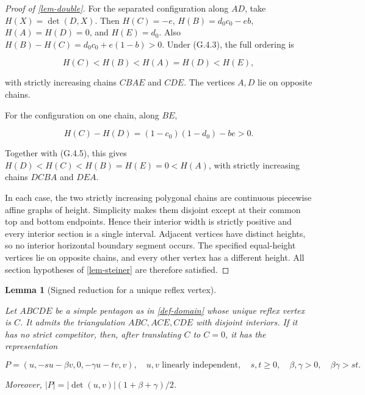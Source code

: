 \documentclass[11pt,a4paper]{article}
\theoremstyle{proofmanuscript}
\newtheorem{lemma}[theorem]{Lemma}
\begin{document}
\begin{proof}[Proof of \ref{lem-double}]
For the separated configuration along \(AD\), take \(H(X)=\det(D,X)\). Then \(H(C)=-e\), \(H(B)=d_0c_0-eb\), \(H(A)=H(D)=0\), and \(H(E)=d_0\). Also \(H(B)-H(C)=d_0c_0+e(1-b)>0\). Under (G.4.3), the full ordering is

\[
H(C)<H(B)<H(A)=H(D)<H(E),
\]

with strictly increasing chains \(CBAE\) and \(CDE\). The vertices \(A,D\) lie on opposite chains.

For the configuration on one chain, along \(BE\),

\[
H(C)-H(D)=(1-c_0)(1-d_0)-be>0.
\]

Together with (G.4.5), this gives \(H(D)<H(C)<H(B)=H(E)=0<H(A)\), with strictly increasing chains \(DCBA\) and \(DEA\).

In each case, the two strictly increasing polygonal chains are continuous piecewise affine graphs of height. Simplicity makes them disjoint except at their common top and bottom endpoints. Hence their interior width is strictly positive and every interior section is a single interval. Adjacent vertices have distinct heights, so no interior horizontal boundary segment occurs. The specified equal-height vertices lie on opposite chains, and every other vertex has a different height. All section hypotheses of \ref{lem-steiner} are therefore satisfied.

\end{proof}

\begin{lemma}[Signed reduction for a unique reflex vertex]\label{lem-single}

Let \(ABCDE\) be a simple pentagon as in \ref{def-domain} whose unique reflex vertex is \(C\). It admits the triangulation \(ABC,ACE,CDE\) with disjoint interiors. If it has no strict competitor, then, after translating \(C\) to \(C=0\), it has the representation

\[
P=(u,-su-\beta v,0,-\gamma u-tv,v),\quad u,v\text{ linearly independent},\quad s,t\ge0,\quad\beta,\gamma>0,\quad\beta\gamma>st.
\]

Moreover, \(|P|=|\det(u,v)|(1+\beta+\gamma)/2\).

\end{lemma}
\end{document}
